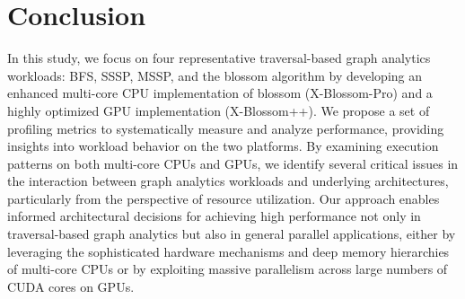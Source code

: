 \section{Conclusion}
In this study, we focus on four representative traversal-based graph analytics workloads: BFS, SSSP, MSSP, and the blossom algorithm by developing an enhanced multi-core CPU implementation of blossom (X-Blossom-Pro) and a highly optimized GPU implementation (X-Blossom++). We propose a set of profiling metrics to systematically measure and analyze performance, providing insights into workload behavior on the two platforms. By examining execution patterns on both multi-core CPUs and GPUs, we identify several critical issues in the interaction between graph analytics workloads and underlying architectures, particularly from the perspective of resource utilization. Our approach enables informed architectural decisions for achieving high performance not only in traversal-based graph analytics but also in general parallel applications, either by leveraging the sophisticated hardware mechanisms and deep memory hierarchies of multi-core CPUs or by exploiting massive parallelism across large numbers of CUDA cores on GPUs.
